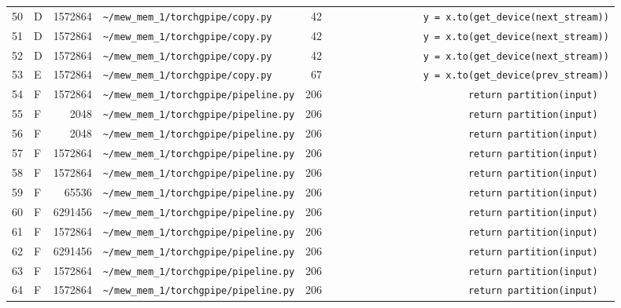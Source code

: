 \documentclass{article}
\begin{document}
\begin{longtable}{r l r p{6.5cm} r p{7.0cm}}
50 & D & 1572864 & \lstinline|~/mew_mem_1/torchgpipe/copy.py| & 42 & \lstinline|                y = x.to(get_device(next_stream))| \\
51 & D & 1572864 & \lstinline|~/mew_mem_1/torchgpipe/copy.py| & 42 & \lstinline|                y = x.to(get_device(next_stream))| \\
52 & D & 1572864 & \lstinline|~/mew_mem_1/torchgpipe/copy.py| & 42 & \lstinline|                y = x.to(get_device(next_stream))| \\
53 & E & 1572864 & \lstinline|~/mew_mem_1/torchgpipe/copy.py| & 67 & \lstinline|                y = x.to(get_device(prev_stream))| \\
54 & F & 1572864 & \lstinline|~/mew_mem_1/torchgpipe/pipeline.py| & 206 & \lstinline|                        return partition(input)| \\
55 & F & 2048 & \lstinline|~/mew_mem_1/torchgpipe/pipeline.py| & 206 & \lstinline|                        return partition(input)| \\
56 & F & 2048 & \lstinline|~/mew_mem_1/torchgpipe/pipeline.py| & 206 & \lstinline|                        return partition(input)| \\
57 & F & 1572864 & \lstinline|~/mew_mem_1/torchgpipe/pipeline.py| & 206 & \lstinline|                        return partition(input)| \\
58 & F & 1572864 & \lstinline|~/mew_mem_1/torchgpipe/pipeline.py| & 206 & \lstinline|                        return partition(input)| \\
59 & F & 65536 & \lstinline|~/mew_mem_1/torchgpipe/pipeline.py| & 206 & \lstinline|                        return partition(input)| \\
60 & F & 6291456 & \lstinline|~/mew_mem_1/torchgpipe/pipeline.py| & 206 & \lstinline|                        return partition(input)| \\
61 & F & 1572864 & \lstinline|~/mew_mem_1/torchgpipe/pipeline.py| & 206 & \lstinline|                        return partition(input)| \\
62 & F & 6291456 & \lstinline|~/mew_mem_1/torchgpipe/pipeline.py| & 206 & \lstinline|                        return partition(input)| \\
63 & F & 1572864 & \lstinline|~/mew_mem_1/torchgpipe/pipeline.py| & 206 & \lstinline|                        return partition(input)| \\
64 & F & 1572864 & \lstinline|~/mew_mem_1/torchgpipe/pipeline.py| & 206 & \lstinline|                        return partition(input)| \\

\end{longtable}
\end{document}
